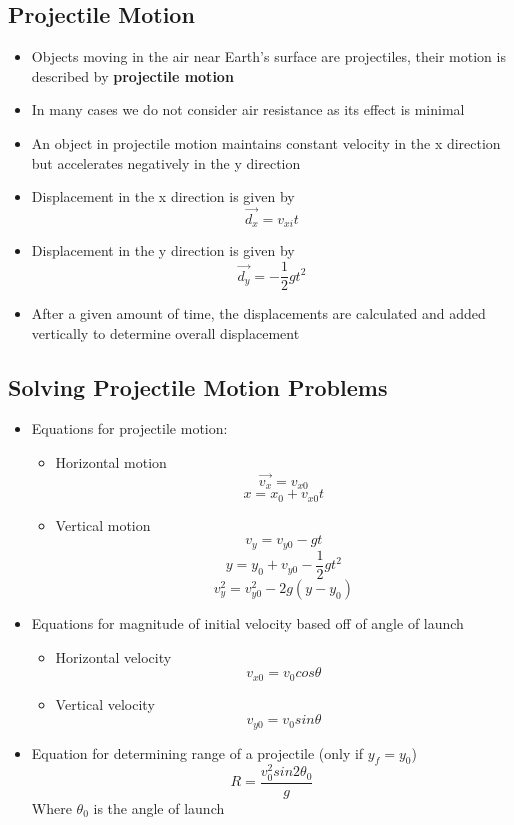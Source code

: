 \subsection{Projectile Motion}
\begin{itemize}
    \item Objects moving in the air near Earth's surface are projectiles, their motion is described by \textbf{projectile motion}
    \item In many cases we do not consider air resistance as its effect is minimal
    \item An object in projectile motion maintains constant velocity in the x direction but accelerates negatively in the y direction
    \item Displacement in the x direction is given by \[\vec{d_x}=v_{xi}t\]
    \item Displacement in the y direction is given by \[\vec{d_y}=-\frac{1}{2}gt^2\]
    \item After a given amount of time, the displacements are calculated and added vertically to determine overall displacement
\end{itemize}

\subsection{Solving Projectile Motion Problems}
\begin{itemize}
    \item Equations for projectile motion: 
    \begin{itemize}
        \item Horizontal motion \[\vec{v_x}=v_{x0}\] \[x=x_0+v_{x0}t\]
        \item Vertical motion \[v_y=v_{y0}-gt\] \[y=y_0+v_{y0}-\frac{1}{2}gt^2\] \[v_y^2=v_{y0}^2-2g(y-y_0)\]
    \end{itemize}
    \item Equations for magnitude of initial velocity based off of angle of launch
    \begin{itemize}
        \item Horizontal velocity \[v_{x0}=v_0cos\theta\]
        \item Vertical velocity\[v_{y0}=v_0sin\theta\]
    \end{itemize}
    \item Equation for determining range of a projectile (only if $y_f=y_0$) \[R=\frac{v_0^2sin2\theta _0}{g}\]
    Where $\theta _0$ is the angle of launch
\end{itemize}

